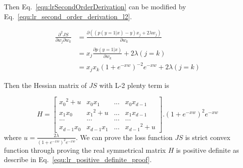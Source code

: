 \documentclass[runningheads,openany]{xhlPaper}
\begin{document}
Then Eq.~\ref{equ:lrSecondOrderDerivation} can be modified by Eq.~\ref{equ:lr_second_order_derivation_l2}.

\begin{equation}
\label{equ:lr_second_order_derivation_l2}
\begin{aligned}
\frac{{{\partial ^2}JS}}{{\partial {w_j}\partial {w_k}}} &= \frac{{\partial \left( {\left( {p\left( {y = 1|x} \right) - y} \right){x_j} + 2\lambda {w_j}} \right)}}{{\partial {w_k}}}\\
 &= {x_j}\frac{{\partial p\left( {y = 1|x} \right)}}{{\partial {w_k}}} + 2\lambda \left( {j = k} \right)\\
 &= {x_j}{x_k}{\left( {1 + {e^{ - xw}}} \right)^{ - 2}}{e^{ - xw}} + 2\lambda \left( {j = k} \right)
\end{aligned}
\end{equation} 

Then the Hessian matrix of $JS$ with L-2 plenty term is 

\begin{displaymath}
\label{equ:lr_hessian_matrix_loss_l2}
H = \left[ {\begin{array}{*{20}{c}}
{{x_0}^2 + u}&{{x_0}{x_1}}&{...}&{{x_0}{x_{d - 1}}}\\
{{x_1}{x_0}}&{{x_1}^2 + u}&{...}&{{x_1}{x_{d - 1}}}\\
{...}&{...}&{...}&{...}\\
{{x_{d - 1}}{x_0}}&{{x_{d - 1}}{x_1}}&{...}&{{x_{d - 1}}^2 + u}
\end{array}} \right].{\left( {1 + {e^{ - xw}}} \right)^2}{e^{ - xw}}
\end{displaymath}
where $u = \frac{{2\lambda }}{{{{\left( {1 + {e^{ - xw}}} \right)}^2}{e^{ - xw}}}}$. We can prove the loss function $JS$ is strict convex function through proving the real symmetrical matrix $H$ is positive definite as describe in Eq.~\ref{equ:lr_positive_definite_proof}.
\end{document}
